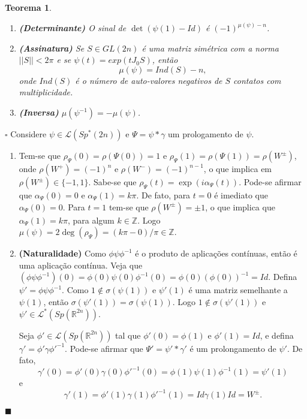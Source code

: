 \documentclass[12pt]{book}
\newtheorem{teorema}{Teorema}[section]
\newenvironment{prova}[1]{$\square$ #1}{\hfill$\blacksquare$}
\newcommand{\caminhosespeciais}[1]{\mathcal{L}^{*}(#1)}
\newcommand{\caminhos}{\mathcal{L}}
\newcommand{\espectrooperador}[1]{\sigma(#1)}
\newcommand{\estruturacomplexa}{J_{0}}
\newcommand{\gruposimpletico}[1]{Sp(#1)}
\newcommand{\gruposimpleticonaodegenerado}[1]{Sp^{#1}(2n)}
\newcommand{\inteiros}{\mathbb{Z}}
\newcommand{\real}[1]{\mathbb{R}^{#1}}
\begin{document}
\begin{teorema}
\begin{enumerate}
			\item \textbf{(Determinante)} O sinal de $ \det(\psi(1)-Id)$ é $(-1)^{\mu(\psi)-n}$.
			
			\item \textbf{(Assinatura)}\label{item_assinatura_maslov} Se $S \in GL(2n)$ é uma matriz simétrica com a norma $||S|| < 2\pi$ e se $\psi(t) = exp(t\estruturacomplexa S)$, então 
			$$
			\mu(\psi) = Ind(S) - n,
			$$
			onde $Ind(S)$ é o número de auto-valores negativos de $S$ contatos com multiplicidade.
			
			\item \textbf{(Inversa)} $\mu(\psi^{-1}) = -\mu(\psi)$.
			
		\end{enumerate}
	\end{teorema}
	\begin{prova}
		
		Considere $\psi \in \caminhos{(\gruposimpleticonaodegenerado{*})}$ e $\Psi=\psi * \gamma$ um prologamento de $\psi$.
		\begin{enumerate}
			\item Tem-se que $\rho_{\Psi}(0) = \rho(\Psi(0)) = 1$ e $\rho_{\Psi}(1) = \rho(\Psi(1)) = \rho(W^{\pm})$, onde $\rho(W^{+})=(-1)^{n}$ e $\rho(W^{-})=(-1)^{n-1}$, o que implica em $\rho(W^{\pm}) \in \{ -1,1\}$. Sabe-se que $\rho_{\Psi}(t) = \exp(i\alpha_{\Psi}(t))$. Pode-se afirmar que $\alpha_{\Psi}(0)=0$ e $\alpha_{\Psi}(1)=k\pi$. De fato, para $t=0$ é imediato que $\alpha_{\Psi}(0)=0$. Para $t=1$ tem-se que $\rho(W^{\pm}) = \pm 1$, o que implica que $\alpha_{\Psi}(1) = k\pi$, para algum $k\in \inteiros$. Logo $\mu(\psi) = 2\deg(\rho_{\Psi}) = (k\pi-0)/\pi \in \inteiros$.
			
			\item \textbf{(Naturalidade)}
			Como $\phi\psi\phi^{-1}$ é o produto de aplicações contínuas, então é uma aplicação contínua. Veja que $(\phi\psi\phi^{-1})(0) = \phi(0)\psi(0)\phi^{-1}(0) = \phi(0)(\phi(0))^{-1} = Id$. Defina $\psi'=\phi\psi\phi^{-1}$. Como $1\notin \espectrooperador{\psi(1)}$ e $\psi'(1)$ é uma matriz semelhante a $\psi(1)$, então $\espectrooperador{\psi'(1)}=\espectrooperador{\psi(1)}$. Logo $1\notin \espectrooperador{\psi'(1)}$ e $\psi'\in \caminhosespeciais{\gruposimpletico{\real{2n}}}$.
			
			Seja $\phi'\in \caminhos(\gruposimpletico{\real{2n}})$ tal que $\phi'(0) = \phi(1)$ e $\phi'(1) = Id$, e defina $\gamma'=\phi'\gamma\phi'^{-1}$. Pode-se afirmar que $\Psi'=\psi'*\gamma'$ é um prolongamento de $\psi'$. De fato, 
			$$
			\gamma'(0)=\phi'(0)\gamma(0)\phi'^{-1}(0) = \phi(1)\psi(1)\phi^{-1}(1) = \psi'(1)
			$$ 
			e 
			$$
			\gamma'(1)=\phi'(1)\gamma(1)\phi'^{-1}(1) = Id\gamma(1)Id = W^{\pm}.
			$$
			

\end{enumerate}
\end{prova}
\end{document}
